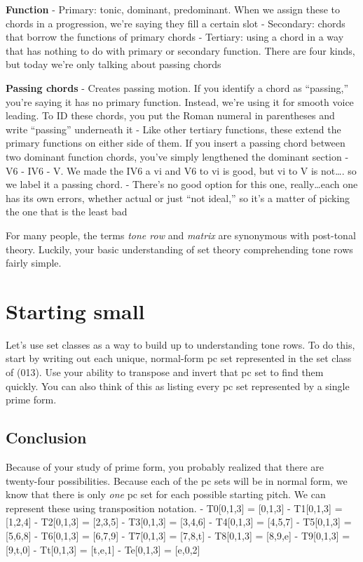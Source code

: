 \documentclass{book}
\begin{document}
\textbf{Function} - Primary: tonic, dominant, predominant. When we assign
these to chords in a progression, we're saying they fill a certain slot -
Secondary: chords that borrow the functions of primary chords - Tertiary:
using a chord in a way that has nothing to do with primary or secondary
function. There are four kinds, but today we're only talking about passing
chords

\textbf{Passing chords} - Creates passing motion. If you identify a chord as
``passing,'' you're saying it has no primary function. Instead, we're using it
for smooth voice leading. To ID these chords, you put the Roman numeral in
parentheses and write ``passing'' underneath it - Like other tertiary
functions, these extend the primary functions on either side of them. If you
insert a passing chord between two dominant function chords, you've simply
lengthened the dominant section - V6 - IV6 - V. We made the IV6 a vi and V6 to
vi is good, but vi to V is not\ldots. so we label it a passing chord. -
There's no good option for this one, really\ldots each one has its own errors,
whether actual or just ``not ideal,'' so it's a matter of picking the one that
is the least bad

For many people, the terms \emph{tone row} and \emph{matrix} are synonymous
with post-tonal theory. Luckily, your basic understanding of set theory
comprehending tone rows fairly simple.

\hypertarget{starting-small}{%
\section{Starting small}\label{starting-small}}

Let's use set classes as a way to build up to understanding tone rows. To do
this, start by writing out each unique, normal-form pc set represented in the
set class of (013). Use your ability to transpose and invert that pc set to
find them quickly. You can also think of this as listing every pc set
represented by a single prime form.

\hypertarget{conclusion-23}{%
\subsection{Conclusion}\label{conclusion-23}}

Because of your study of prime form, you probably realized that there are
twenty-four possibilities. Because each of the pc sets will be in normal form,
we know that there is only \emph{one} pc set for each possible starting pitch.
We can represent these using transposition notation. - T0{[}0,1,3{]} =
{[}0,1,3{]} - T1{[}0,1,3{]} = {[}1,2,4{]} - T2{[}0,1,3{]} = {[}2,3,5{]} -
T3{[}0,1,3{]} = {[}3,4,6{]} - T4{[}0,1,3{]} = {[}4,5,7{]} - T5{[}0,1,3{]} =
{[}5,6,8{]} - T6{[}0,1,3{]} = {[}6,7,9{]} - T7{[}0,1,3{]} = {[}7,8,t{]} -
T8{[}0,1,3{]} = {[}8,9,e{]} - T9{[}0,1,3{]} = {[}9,t,0{]} - Tt{[}0,1,3{]} =
{[}t,e,1{]} - Te{[}0,1,3{]} = {[}e,0,2{]}
\end{document}
